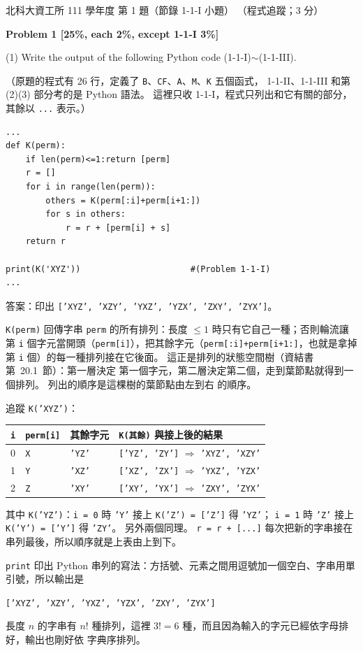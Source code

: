 \begin{pastexam}[label={px:ntut-111-prog-01}]{北科大資工所 111 學年度 第 1 題（節錄 1-1-I 小題）}
（程式追蹤；3 分）

\textbf{Problem 1 [25\%, each 2\%, except 1-1-I 3\%]}

(1) Write the output of the following Python code (1-1-I)$\sim$(1-1-III).

（原題的程式有 26 行，定義了 \texttt{B}、\texttt{CF}、\texttt{A}、\texttt{M}、\texttt{K} 五個函式，
1-1-II、1-1-III 和第 (2)(3) 部分考的是 Python 語法。 這裡只收 1-1-I，程式只列出和它有關的部分，
其餘以 \texttt{...} 表示。）
\begin{verbatim}
...
def K(perm):
    if len(perm)<=1:return [perm]
    r = []
    for i in range(len(perm)):
        others = K(perm[:i]+perm[i+1:])
        for s in others:
            r = r + [perm[i] + s]
    return r

print(K('XYZ'))                      #(Problem 1-1-I)
...
\end{verbatim}
\end{pastexam}

\begin{pastsoln}
答案：印出 \texttt{['XYZ', 'XZY', 'YXZ', 'YZX', 'ZXY', 'ZYX']}。

\texttt{K(perm)} 回傳字串 \texttt{perm} 的所有排列：長度 $\le 1$ 時只有它自己一種；否則輪流讓第
\texttt{i} 個字元當開頭（\texttt{perm[i]}），把其餘字元（\texttt{perm[:i]+perm[i+1:]}，也就是拿掉第
\texttt{i} 個）的每一種排列接在它後面。 這正是排列的狀態空間樹（資結書第~20.1~節）：第一層決定
第一個字元，第二層決定第二個，走到葉節點就得到一個排列。 列出的順序是這棵樹的葉節點由左到右
的順序。

追蹤 \texttt{K('XYZ')}：
\begin{center}
\small
\begin{tabular}{clll}
\toprule
\texttt{i} & \texttt{perm[i]} & 其餘字元 & \texttt{K(其餘)} 與接上後的結果 \\
\midrule
0 & \texttt{X} & \texttt{'YZ'} & \texttt{['YZ', 'ZY']} $\Rightarrow$ \texttt{'XYZ', 'XZY'} \\
1 & \texttt{Y} & \texttt{'XZ'} & \texttt{['XZ', 'ZX']} $\Rightarrow$ \texttt{'YXZ', 'YZX'} \\
2 & \texttt{Z} & \texttt{'XY'} & \texttt{['XY', 'YX']} $\Rightarrow$ \texttt{'ZXY', 'ZYX'} \\
\bottomrule
\end{tabular}
\end{center}
其中 \texttt{K('YZ')}：\texttt{i = 0} 時 \texttt{'Y'} 接上 \texttt{K('Z') = ['Z']} 得 \texttt{'YZ'}；
\texttt{i = 1} 時 \texttt{'Z'} 接上 \texttt{K('Y') = ['Y']} 得 \texttt{'ZY'}。 另外兩個同理。
\texttt{r = r + [...]} 每次把新的字串接在串列最後，所以順序就是上表由上到下。

\texttt{print} 印出 Python 串列的寫法：方括號、元素之間用逗號加一個空白、字串用單引號，所以輸出是
\begin{center}
\texttt{['XYZ', 'XZY', 'YXZ', 'YZX', 'ZXY', 'ZYX']}
\end{center}
長度 $n$ 的字串有 $n!$ 種排列，這裡 $3! = 6$ 種，而且因為輸入的字元已經依字母排好，輸出也剛好依
字典序排列。
\end{pastsoln}
